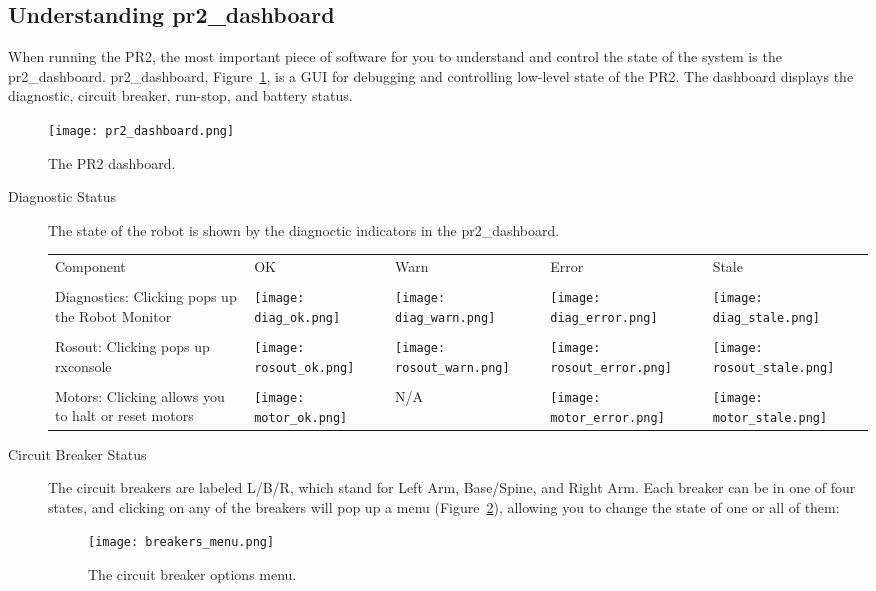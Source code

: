 \subsection{Understanding pr2\_dashboard}
When running the PR2, the most important piece of software for you to understand and control the state of the system is 
the pr2\_dashboard. pr2\_dashboard, Figure~\ref{fig:dashboard}, is a GUI for debugging and controlling low-level state 
of the PR2. The dashboard displays the diagnostic, circuit breaker, run-stop, and battery status.
\begin{figure}[h]
\centering
\texttt{[image: pr2\_dashboard.png]}
\caption{The PR2 dashboard.}
\label{fig:dashboard}
\end{figure}
\begin{description}
\item[Diagnostic Status] The state of the robot is shown by the diagnoctic indicators in the pr2\_dashboard. \\

    \begin{tabular}{m{6cm}SSSS}
    Component & OK & Warn & Error & Stale\\
    &&&&\\
    Diagnostics: Clicking pops up the Robot Monitor & \texttt{[image: diag\_ok.png]}&\texttt{[image: diag\_warn.png]}&
                                                      \texttt{[image: diag\_error.png]}&\texttt{[image: diag\_stale.png]}\\
    &&&&\\
    Rosout: Clicking pops up rxconsole & \texttt{[image: rosout\_ok.png]}&\texttt{[image: rosout\_warn.png]}&
                                        \texttt{[image: rosout\_error.png]}&\texttt{[image: rosout\_stale.png]}\\
    &&&&\\
    Motors: Clicking allows you to halt or reset motors & \texttt{[image: motor\_ok.png]}& N/A &
                                                          \texttt{[image: motor\_error.png]}&\texttt{[image: motor\_stale.png]}\\
   \end{tabular}

\item[Circuit Breaker Status] The circuit breakers are labeled L/B/R, which stand for Left Arm, Base/Spine, and Right Arm. 
Each breaker can be in one of four states, and clicking on any of the breakers will pop up a menu (Figure~\ref{fig:breaker_menu}), allowing you to change the state of one or all of them:
\begin{figure}[h]
\centering
\texttt{[image: breakers\_menu.png]}
\caption{The circuit breaker options menu.}
\label{fig:breaker_menu}
\end{figure}


\end{description}
